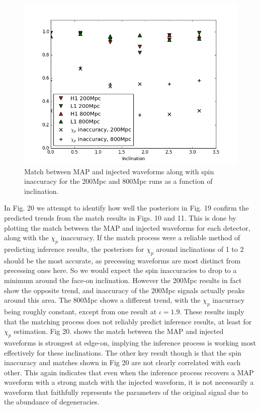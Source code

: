 \documentclass[11pt]{article}
\begin{document}
\begin{figure}[h]
	\includegraphics[scale=0.6]{fig20.png}
	\centering
	\caption{Match between MAP and injected waveforms along with spin inaccuracy for the 200Mpc and 800Mpc runs as a function of inclination.}
	\centering
\end{figure}

In Fig. 20 we attempt to identify how well the posteriors in Fig. 19 confirm the predicted trends from the match results in Figs. 10 and 11. This is done by plotting the match between the MAP and injected waveforms for each detector, along with the $\chi_p$ inaccuracy. If the match process were a reliable method of predicting inference results, the posteriors for $\chi_p$ around inclinations of 1 to 2 should be the most accurate, as precessing waveforms are most distinct from precessing ones here. So we would expect the spin inaccuracies to drop to a minimum around the face-on inclination. However the 200Mpc results in fact show the opposite trend, and inaccuracy of the 200Mpc signals actually peaks around this area. The 800Mpc shows a different trend, with the $\chi_p$ inacurracy being roughly constant, except from one result at $\iota=1.9$. These results imply that the matching process does not reliably predict inference results, at least for $\chi_p$ estimation. Fig 20. shows the match between the MAP and injected waveforms is strongest at edge-on, implying the inference process is working most effectively for these inclinations. The other key result though is that the spin inaccuracy and matches shown in Fig 20 are not clearly correlated with each other. This again indicates that even when the inference process recovers a MAP waveform with a strong match with the injected waveform, it is not necessarily a waveform that faithfully represents the parameters of the original signal due to the abundance of degeneracies. 
\end{document}
